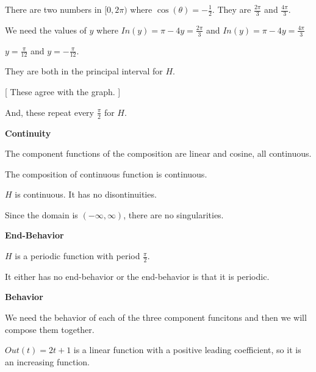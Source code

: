 \documentclass{ximera}
\begin{document}
There are two numbers in $[0, 2\pi)$ where $\cos(\theta) = -\frac{1}{2}$.  They are $\frac{2\pi}{3}$ and $\frac {4\pi}{3}$.

We need the values of $y$ where $In(y) = \pi - 4y = \frac{2\pi}{3}$ and $In(y) = \pi - 4y = \frac{4\pi}{3}$

$y = \frac{\pi}{12}$  and   $y = -\frac{\pi}{12}$.

They are both in the principal interval for $H$. 

[ These agree with the graph. ]


And, these repeat every $\frac{\pi}{2}$ for $H$.

















\textbf{\textcolor{blue!55!black}{Continuity}}


The component functions of the composition are linear and cosine, all continuous. 

The composition of continuous function is continuous.

$H$ is continuous. It has no disontinuities. 


Since the domain is $(-\infty, \infty)$, there are no singularities. 








\textbf{\textcolor{blue!55!black}{End-Behavior}}


$H$ is a periodic function with period $\frac{\pi}{2}$. 

It either has no end-behavior or the end-behavior is that it is periodic.

















\textbf{\textcolor{blue!55!black}{Behavior}}


We need the behavior of each of the three component funcitons and then we will compose them together. 




$Out(t) = 2t + 1$ is a linear function with a positive leading coefficient, so it is an increasing function.
\end{document}
